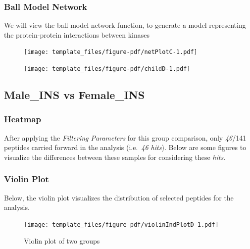 \documentclass[
  letterpaper,
  DIV=11,
  numbers=noendperiod]{scrreport}
\begin{document}
\hypertarget{ball-model-network-2}{%
\subsubsection{Ball Model Network}\label{ball-model-network-2}}

We will view the ball model network function, to generate a model
representing the protein-protein interactions between kinases

\begin{figure}[htbp]

{\centering \texttt{[image: template\_files/figure-pdf/netPlotC-1.pdf]}

}

\end{figure}

\newpage

\begin{figure}[htbp]

{\centering \texttt{[image: template\_files/figure-pdf/childD-1.pdf]}

}

\end{figure}

\hypertarget{male_ins-vs-female_ins}{%
\subsection{Male\_INS vs Female\_INS}\label{male_ins-vs-female_ins}}

\hypertarget{heatmap-3}{%
\subsubsection{Heatmap}\label{heatmap-3}}

After applying the \emph{Filtering Parameters} for this group
comparison, only \emph{46}/141 peptides carried forward in the analysis
(i.e.~\emph{46 hits}). Below are some figures to visualize the
differences between these samples for considering these \emph{hits}.

\hypertarget{violin-plot-3}{%
\subsubsection{Violin Plot}\label{violin-plot-3}}

Below, the violin plot visualizes the distribution of selected peptides
for the analysis.

\begin{figure}[htbp]

{\centering \texttt{[image: template\_files/figure-pdf/violinIndPlotD-1.pdf]}

}

\caption{Violin plot of two groups}

\end{figure}
\end{document}
